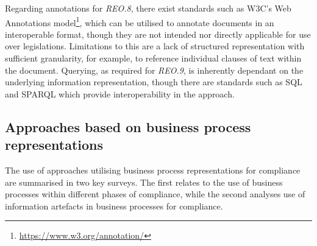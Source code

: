 Regarding annotations for \textit{REO.8}, there exist standards such as W3C's Web Annotations model\footnote{\url{https://www.w3.org/annotation/}}, which can be utilised to annotate documents in an interoperable format, though they are not intended nor directly applicable for use over legislations.
Limitations to this are a lack of structured representation with sufficient granularity, for example, to reference individual clauses of text within the document.
Querying, as required for \textit{REO.9}, is inherently dependant on the underlying information representation, though there are standards such as SQL and SPARQL which provide interoperability in the approach.

\subsection{Approaches based on business process representations}\label{sota:models:process}
The use of approaches utilising business process representations for compliance are summarised in two key surveys. The first \cite{fellmann_state---art_2014} relates to the use of business processes within different phases of compliance, while the second \cite{benyoucef_information_2015} analyses use of information artefacts in business processes for compliance.

